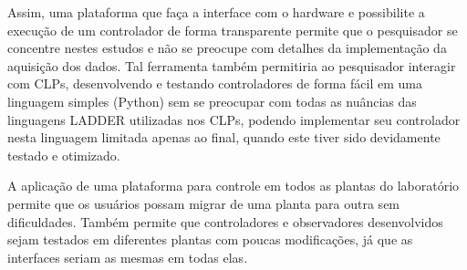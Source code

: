 Assim, uma plataforma que faça a interface com o hardware e possibilite a
execução de um controlador de forma transparente permite que o pesquisador se
concentre nestes estudos e não se preocupe com detalhes da implementação da
aquisição dos dados. Tal ferramenta também permitiria ao pesquisador
interagir com CLPs, desenvolvendo e testando controladores de forma fácil em
uma linguagem simples (Python) sem se preocupar com todas as nuâncias das
linguagens LADDER utilizadas nos CLPs, podendo implementar seu controlador nesta
linguagem limitada apenas ao final, quando este tiver sido devidamente testado e
otimizado.

A aplicação de uma plataforma para controle em todos as plantas do laboratório
permite que os usuários possam migrar de uma planta para outra sem dificuldades.
Também permite que controladores e observadores desenvolvidos sejam testados em
diferentes plantas com poucas modificações, já que as interfaces seriam as
mesmas em todas elas.
